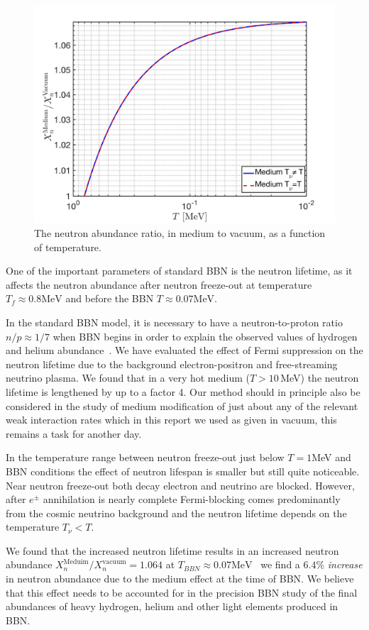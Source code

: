 \begin{figure} 
\centerline{\includegraphics[width=0.9\linewidth]{./plots/Neutron_Abundance}}
\caption{The neutron abundance ratio, in medium to vacuum, as a function of temperature. }
\label{Neutron:Abundance} 
\end{figure}

One of the important parameters of standard BBN is the neutron lifetime, as it affects the neutron abundance after neutron freeze-out at temperature $T_f\approx 0.8 \mathrm{MeV}$ and before the BBN $T\approx0.07 \mathrm{MeV}$. 

In the standard BBN model, it is necessary to have a neutron-to-proton ratio $n/p\approx1/7$ when BBN begins in order to explain the observed values of hydrogen and helium abundance~\cite{Pitrou:2018cgg}. We have evaluated the effect of Fermi suppression on the neutron lifetime due to the background electron-positron  and free-streaming neutrino plasma. We found that in a very hot medium ($T>10$\,MeV) the neutron lifetime is lengthened by up to a factor 4. Our method should in principle also be considered in the study of medium modification of just about any of the relevant weak interaction rates which in this report we used as given in vacuum,  this remains a task for another day.

In the temperature range between neutron freeze-out just below $T=1$\;MeV and BBN conditions the effect of neutron lifespan is smaller but still quite noticeable. Near neutron freeze-out both decay electron and neutrino are blocked. However, after $e^\pm$ annihilation is nearly complete  Fermi-blocking comes predominantly from the cosmic neutrino background and the neutron lifetime depends on the temperature $T_\nu<T$.

We found that the increased neutron lifetime results in an increased neutron abundance ${X_n^{\mathrm{Meduim}}}/{X_n^{\mathrm{vacuum}}}=1.064$ at $T_{BBN}\approx0.07 \mathrm{MeV}$ \ie\ we find a $6.4\%$ \emph{increase} in neutron abundance due to the medium effect at the time of BBN. We believe that this effect needs to be accounted for in the precision BBN study of the final abundances of heavy hydrogen, helium and other light elements produced in BBN.
